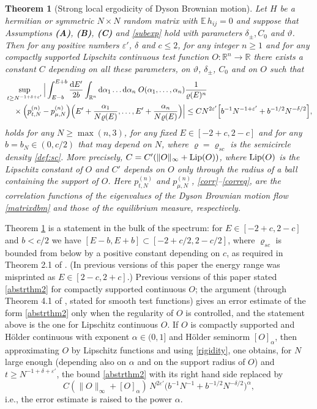 \documentclass[draft]{article}
\newcommand{\e}{\varepsilon}
\newcommand{\rd}{{\rm d}}
\newcommand{\bR}{{\mathbb R}}
\newcommand{\be}{\begin{equation}}
\newcommand{\ee}{\end{equation}}
\newcommand{\E}{{\mathbb E }}
\newcommand{\R}{{\mathbb R }}
\newtheorem{theorem}{Theorem}
\numberwithin{equation}{section}
\numberwithin{theorem}{section}
\numberwithin{definition}{section}
\numberwithin{remark}{section}
\begin{document}
\begin{theorem}  [Strong local ergodicity of Dyson Brownian motion] \label{thm:main} 
Let $H$ be a hermitian or symmetric $N\times N$ random matrix with $\E\, h_{ij}=0$
and suppose that Assumptions {\bf (A)}, {\bf (B)}, {\bf (C)}  and   \eqref{subexp} hold
with parameters $\delta_\pm, C_0$ and $\vartheta$.
 Then for any positive numbers $\e'$, $\delta$ and $c\le 2$, for
any integer $n\ge 1$ and for any compactly supported Lipschitz continuous test function
$O:\bR^n\to \bR$ there exists a constant $C$ depending on all these parameters, on
$\vartheta$, $\delta_\pm$, $C_0$ and on $O$
such that
\be
\begin{split}
&  \sup_{t\ge N^{-1 + \delta + \e'}}  \Big | \int_{E-b}^{E+b}\frac{\rd E'}{2b}
\int_{\R^n}   \rd\alpha_1
\ldots \rd\alpha_n \; O(\alpha_1,\ldots,\alpha_n) 
 \frac{1}{\varrho(E)^n} \\
& \quad \times   \Big ( p_{t,N}^{(n)}  - p_{\mu, N} ^{(n)} \Big )
\Big (E'+\frac{\alpha_1}{N\varrho(E)},
\ldots, E'+\frac{\alpha_n}{ N\varrho(E)}\Big) \Big | 
\leq 
C N^{2 \e'} \Big[ b^{-1}  N^{ - 1+\e' } +  b^{-1/2} N^{-\delta/2} \Big],
\label{abstrthm2}
\end{split}
\ee
holds for any $N\ge \max(n,3)$, for any fixed $E\in [-2+c, 2-c] $ and for
any  $b=b_N\in (0,c/2)$ that may depend on $N$, where $\varrho=\varrho_{sc}$ is the semicircle
density \eqref{def:sc}. More precisely, $C=C'(\|O\|_\infty+{\rm Lip}(O))$, where ${\rm Lip}(O)$ is the
Lipschitz constant of $O$ and $C'$ depends on $O$ only through the radius of a ball containing
the support of $O$.
Here  $ p_{t,N}^{(n)}$ and  $ p_{\mu,N}^{(n)}$, \eqref{corr}--\eqref{correq},
 are the correlation functions of the
eigenvalues of the Dyson Brownian motion flow \eqref{matrixdbm}  and those of
the equilibrium measure, respectively. 
\end{theorem}

\medskip

 Theorem \ref{thm:main} is a statement in the bulk of the spectrum:
for $E\in[-2+c,2-c]$ and $b<c/2$ we have $[E-b,E+b]\subset[-2+c/2,2-c/2]$, where $\varrho_{sc}$
is bounded from below by a positive constant depending on $c$, as required in Theorem 2.1 of \cite{ESYY}.
(In previous versions of this paper the energy range was misprinted as $E\in[2-c,2+c]$.)
Previous versions of this paper stated \eqref{abstrthm2} for compactly supported continuous $O$;
the argument (through Theorem 4.1 of \cite{ESYY}, stated for smooth test functions) gives an error
estimate of the form \eqref{abstrthm2} only when the regularity of $O$ is controlled, and the statement
above is the one for Lipschitz continuous $O$. If $O$ is compactly supported and H\"older continuous
with exponent $\alpha\in(0,1]$ and H\"older seminorm $[O]_\alpha$, then approximating $O$ by Lipschitz
functions and using \eqref{rigidity}, one obtains, for $N$ large enough (depending also on $\alpha$
and on the support radius of $O$) and $t\ge N^{-1+\delta+\e'}$, the bound \eqref{abstrthm2} with its
right hand side replaced by
$$
C(\|O\|_\infty+[O]_\alpha)\, N^{2\e'}\Big( b^{-1}  N^{-1} +  b^{-1/2} N^{-\delta/2} \Big)^\alpha ,
$$
i.e., the error estimate is raised to the power $\alpha$.
\end{document}
